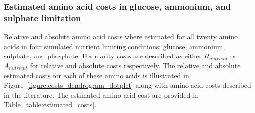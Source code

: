 \subsubsection{Estimated amino acid costs in glucose, ammonium, and sulphate limitation}

Relative and absolute amino acid costs where estimated for all twenty amino acids in four simulated nutrient limiting conditions: glucose, ammonium, sulphate, and phosphate. For clarity costs are described as either $R_{nutrient}$ or $A_{nutrient}$ for relative and absolute costs respectively. The relative and absolute estimated costs for each of these amino acids is illustrated in Figure~\vref{figure:costs_dendrogram_dotplot} along with amino acid costs described in the literature. The estimated amino acid cost are provided in Table~\vref{table:estimated_costs}.

